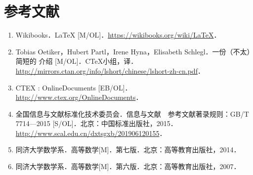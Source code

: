 \documentclass{ctexbook}
\begin{document}
\appendix

\chapter{参考文献}

\begin{enumerate}
	\item Wikibooks．LaTeX [M/OL]．\url{https://wikibooks.org/wiki/LaTeX}．
	\item Tobias Oetiker，Hubert Partl，Irene Hyna，Elisabeth Schlegl．一份（不太）简短的 \LaTeXe 介绍 [M/OL]．C\TeX 小组，译．\newline
	      \url{http://mirrors.ctan.org/info/lshort/chinese/lshort-zh-cn.pdf}．
	\item CTEX : OnlineDocuments [EB/OL]．\url{http://www.ctex.org/OnlineDocuments}．
	\item 全国信息与文献标准化技术委员会．信息与文献　参考文献著录规则：GB/T 7714—2015 [S/OL]．北京：中国标准出版社，2015．\newline
	      \url{http://www.scal.edu.cn/dxtsgxb/201906120155}．
	\item 同济大学数学系．高等数学[M]．第七版．北京：高等教育出版社，2014．
	\item 同济大学数学系．高等数学[M]．第六版．北京：高等教育出版社，2007．
\end{enumerate}
\end{document}
